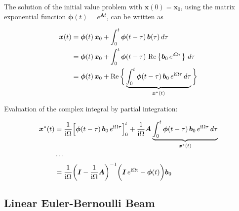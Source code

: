 The solution of the initial value problem with $\boldsymbol{x}(0) = \boldsymbol{x}_{0}$, using the matrix exponential function $\boldsymbol{\phi}(t) = e^{\boldsymbol{A}t}$, can be written as

\begin{align}
\boldsymbol{x}(t) &= \boldsymbol{\phi}(t)\,\boldsymbol{x}_{0} + \int_{0}^{t} \boldsymbol{\phi}(t - \tau)\,\boldsymbol{b}(\tau)\,d\tau \\
&= \boldsymbol{\phi}(t)\,\boldsymbol{x}_{0} + \int_{0}^{t} \boldsymbol{\phi}(t - \tau)\,\operatorname{Re}\left\{\boldsymbol{b}_{0}\,e^{\rm{i}\Omega \tau}\right\}\,d\tau \\
&= \boldsymbol{\phi}(t)\,\boldsymbol{x}_{0} + \operatorname{Re}\bigg\{\underbrace{\int_{0}^{t} \boldsymbol{\phi}(t - \tau)\,\boldsymbol{b}_{0}\,e^{\rm{i}\Omega \tau}\,d\tau}_{\boldsymbol{x}^{*}(t)}\bigg\} \\
\end{align}

Evaluation of the complex integral by partial integration:

\begin{align*}
\boldsymbol{x}^{*}(t) &= \frac{1}{\rm{i}\Omega}\Bigl[ \boldsymbol{\phi}(t - \tau)\,\boldsymbol{b}_{0}\,e^{\rm{i}\Omega \tau} \Bigr]_{0}^{t} + \frac{1}{\rm{i}\Omega}\boldsymbol{A} \underbrace{\int_{0}^{t} \boldsymbol{\phi}(t - \tau)\,\boldsymbol{b}_{0}\,e^{\rm{i}\Omega \tau} \,d\tau}_{\boldsymbol{x}^{*}(t)} \\
&\cdots \\
&= \frac{1}{\rm{i}\Omega}\bigg(\boldsymbol{I} - \frac{1}{\rm{i}\Omega}\boldsymbol{A}\bigg)^{-1}\bigg(\boldsymbol{I}\,e^{\rm{i}\Omega t} - \boldsymbol{\phi}(t)\bigg)\boldsymbol{b}_{0}
\end{align*}


%
%

\newpage
\subsection*{Linear Euler-Bernoulli Beam}

